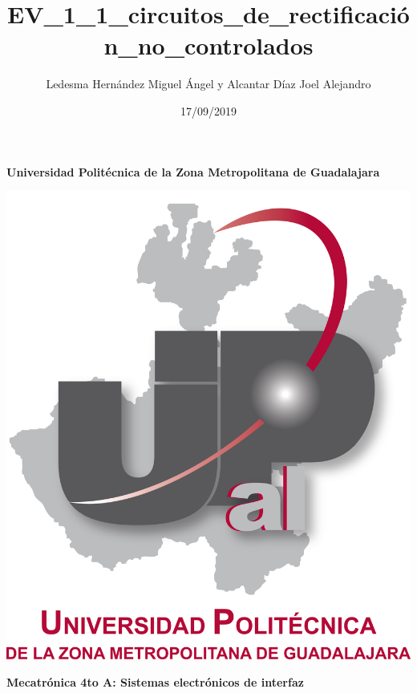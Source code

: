﻿\documentclass[letterpaper]{article}
\title{EV\_1\_1\_circuitos\_de\_rectificación\_no\_controlados}
\author{Ledesma Hernández Miguel Ángel y Alcantar Díaz Joel Alejandro}
\date{17/09/2019}
\begin{document}
{\maketitle}






\vspace{6cm}
\begin{center}
    \textbf{Universidad Politécnica  de la Zona Metropolitana de Guadalajara}\\

\end{center}



\vspace{.3cm}
\begin{center}
\centering
\includegraphics[scale=0.3]{UPZMGLog.png}\\
\vspace{1cm}

    \textbf{Mecatr\'onica 4to A: Sistemas electr\'onicos de interfaz}

\end{center}
\end{document}
